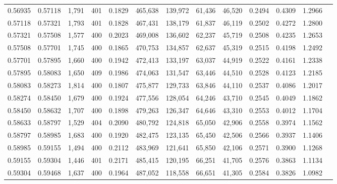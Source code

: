 \begin{tabular}{rrrrrrrrrrrrr}
0.56935 & 0.57118 & 1,791 & 401 &                                     0.1829 & 465,638 & 139,972 &  61,436 &  46,520 & 0.2494 & 0.4309 & 1.2966 \\
0.57118 & 0.57321 & 1,793 & 401 &                                     0.1828 & 467,431 & 138,179 &  61,837 &  46,119 & 0.2502 & 0.4272 & 1.2800 \\
0.57321 & 0.57508 & 1,577 & 400 &                                     0.2023 & 469,008 & 136,602 &  62,237 &  45,719 & 0.2508 & 0.4235 & 1.2653 \\
0.57508 & 0.57701 & 1,745 & 400 &                                     0.1865 & 470,753 & 134,857 &  62,637 &  45,319 & 0.2515 & 0.4198 & 1.2492 \\
0.57701 & 0.57895 & 1,660 & 400 &                                     0.1942 & 472,413 & 133,197 &  63,037 &  44,919 & 0.2522 & 0.4161 & 1.2338 \\
0.57895 & 0.58083 & 1,650 & 409 &                                     0.1986 & 474,063 & 131,547 &  63,446 &  44,510 & 0.2528 & 0.4123 & 1.2185 \\
0.58083 & 0.58273 & 1,814 & 400 &                                     0.1807 & 475,877 & 129,733 &  63,846 &  44,110 & 0.2537 & 0.4086 & 1.2017 \\
0.58274 & 0.58450 & 1,679 & 400 &                                     0.1924 & 477,556 & 128,054 &  64,246 &  43,710 & 0.2545 & 0.4049 & 1.1862 \\
0.58450 & 0.58632 & 1,707 & 400 &                                     0.1898 & 479,263 & 126,347 &  64,646 &  43,310 & 0.2553 & 0.4012 & 1.1704 \\
0.58633 & 0.58797 & 1,529 & 404 &                                     0.2090 & 480,792 & 124,818 &  65,050 &  42,906 & 0.2558 & 0.3974 & 1.1562 \\
0.58797 & 0.58985 & 1,683 & 400 &                                     0.1920 & 482,475 & 123,135 &  65,450 &  42,506 & 0.2566 & 0.3937 & 1.1406 \\
0.58985 & 0.59155 & 1,494 & 400 &                                     0.2112 & 483,969 & 121,641 &  65,850 &  42,106 & 0.2571 & 0.3900 & 1.1268 \\
0.59155 & 0.59304 & 1,446 & 401 &                                     0.2171 & 485,415 & 120,195 &  66,251 &  41,705 & 0.2576 & 0.3863 & 1.1134 \\
0.59304 & 0.59468 & 1,637 & 400 &                                     0.1964 & 487,052 & 118,558 &  66,651 &  41,305 & 0.2584 & 0.3826 & 1.0982 \\

\end{tabular}
